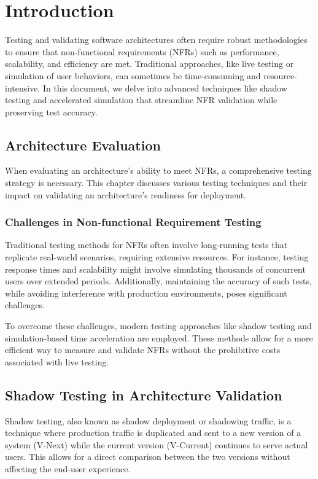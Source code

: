 \chapter{Introduction}

Testing and validating software architectures often require robust methodologies to ensure that non-functional requirements (NFRs) such as performance, scalability, and efficiency are met. Traditional approaches, like live testing or simulation of user behaviors, can sometimes be time-consuming and resource-intensive. In this document, we delve into advanced techniques like shadow testing and accelerated simulation that streamline NFR validation while preserving test accuracy.

\section{Architecture Evaluation}

When evaluating an architecture’s ability to meet NFRs, a comprehensive testing strategy is necessary. This chapter discusses various testing techniques and their impact on validating an architecture’s readiness for deployment.

\subsection{Challenges in Non-functional Requirement Testing}

Traditional testing methods for NFRs often involve long-running tests that replicate real-world scenarios, requiring extensive resources. For instance, testing response times and scalability might involve simulating thousands of concurrent users over extended periods. Additionally, maintaining the accuracy of such tests, while avoiding interference with production environments, poses significant challenges.

To overcome these challenges, modern testing approaches like shadow testing and simulation-based time acceleration are employed. These methods allow for a more efficient way to measure and validate NFRs without the prohibitive costs associated with live testing.

\section{Shadow Testing in Architecture Validation}

Shadow testing, also known as shadow deployment or shadowing traffic, is a technique where production traffic is duplicated and sent to a new version of a system (V-Next) while the current version (V-Current) continues to serve actual users. This allows for a direct comparison between the two versions without affecting the end-user experience.

